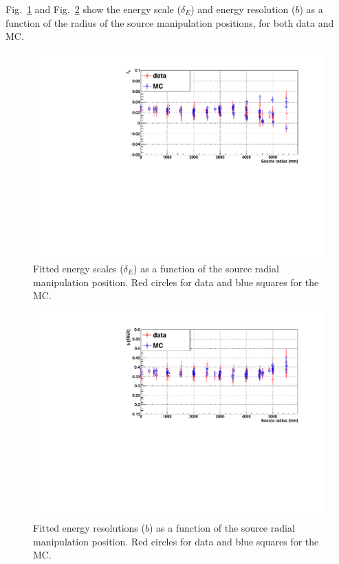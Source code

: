 Fig.~\ref{fig:EscaleVsR} and Fig.~\ref{fig:EresolVsR} show the energy scale ($\delta_E$) and energy resolution ($b$) as a function of the radius of the source manipulation positions, for both data and MC.
\begin{figure}
	\centering
    \includegraphics[width=12cm]{EscaleVsSrcRadius.pdf}
	\caption[Fitted energy scales ($\delta_E$) as a function of the source radial manipulation position.]{Fitted energy scales ($\delta_E$) as a function of the source radial manipulation position. Red circles for data and blue squares for the MC.}
	\label{fig:EscaleVsR}
\end{figure}

\begin{figure}
	\centering
	\includegraphics[width=12cm]{EresolVsSrcRadius.pdf}
	\caption[Fitted energy resolutions ($b$) as a function of the source radial manipulation position.]{Fitted energy resolutions ($b$) as a function of the source radial manipulation position. Red circles for data and blue squares for the MC.}
	\label{fig:EresolVsR}
\end{figure}

